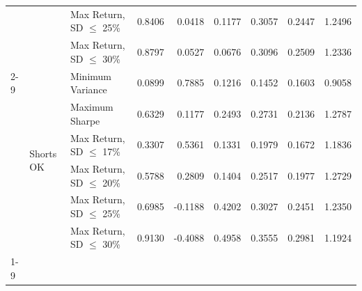 \begin{table}
\begin{tabular}{lllrrrrrr}
 &  & Max Return, SD $\leq$ 25\% & 0.8406 & 0.0418 & 0.1177 & 0.3057 & 0.2447 & 1.2496 \\
 &  & Max Return, SD $\leq$ 30\% & 0.8797 & 0.0527 & 0.0676 & 0.3096 & 0.2509 & 1.2336 \\
\cline{2-9}
 & \multirow[t]{6}{*}{Shorts OK} & Minimum Variance & 0.0899 & 0.7885 & 0.1216 & 0.1452 & 0.1603 & 0.9058 \\
 &  & Maximum Sharpe & 0.6329 & 0.1177 & 0.2493 & 0.2731 & 0.2136 & 1.2787 \\
 &  & Max Return, SD $\leq$ 17\% & 0.3307 & 0.5361 & 0.1331 & 0.1979 & 0.1672 & 1.1836 \\
 &  & Max Return, SD $\leq$ 20\% & 0.5788 & 0.2809 & 0.1404 & 0.2517 & 0.1977 & 1.2729 \\
 &  & Max Return, SD $\leq$ 25\% & 0.6985 & -0.1188 & 0.4202 & 0.3027 & 0.2451 & 1.2350 \\
 &  & Max Return, SD $\leq$ 30\% & 0.9130 & -0.4088 & 0.4958 & 0.3555 & 0.2981 & 1.1924 \\
\cline{1-9} \cline{2-9}
\bottomrule
\end{tabular}
\end{table}
